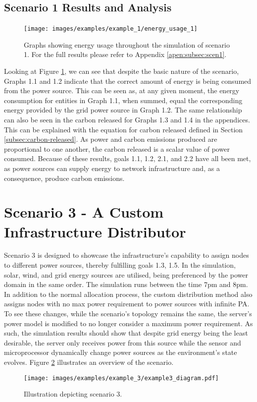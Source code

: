 \documentclass{l4proj}
\begin{document}
\subsection{Scenario 1 Results and Analysis}
\begin{figure}[h]
    \centering
    \texttt{[image: images/examples/example\_1/energy\_usage\_1]}
    ~
    \caption{Graphs showing energy usage throughout the simulation of scenario 1. For the full results please refer to Appendix \ref{apen:subsec:scen1}.}
    \label{fig:example1_results_energy}
\end{figure}
Looking at Figure \ref{fig:example1_results_energy}, we can see that despite the basic nature of the scenario, Graphs 1.1 and 1.2 indicate that the correct amount of energy is being consumed from the power source.
This can be seen as, at any given moment, the energy consumption for entities in Graph 1.1, when summed, equal the corresponding energy provided by the grid power source in Graph 1.2.
The same relationship can also be seen in the carbon released for Graphs 1.3 and 1.4 in the appendices.
This can be explained with the equation for carbon released defined in Section \ref{subsec:carbon-released}.
As power and carbon emissions produced are proportional to one another, the carbon released is a scalar value of power consumed.
Because of these results, goals 1.1, 1.2, 2.1, and 2.2 have all been met, as power sources can supply energy to network infrastructure and, as a consequence, produce carbon emissions.

\section{Scenario 3 - A Custom Infrastructure Distributor}\label{eval:subsec:scenario3}
Scenario 3 is designed to showcase the infrastructure's capability to assign nodes to different power sources, thereby fulfilling goals 1.3, 1.5.
In the simulation, solar, wind, and grid energy sources are utilised, being preferenced by the power domain in the same order.
The simulation runs between the time 7pm and 8pm.
In addition to the normal allocation process, the custom distribution method also assigns nodes with no max power requirement to power sources with infinite PA.
To see these changes, while the scenario's topology remains the same, the server's power model is modified to no longer consider a maximum power requirement.
As such, the simulation results should show that despite grid energy being the least desirable, the server only receives power from this source while the sensor and microprocessor dynamically change power sources as the environment's state evolves.
Figure \ref{fig:example3_diagram} illustrates an overview of the scenario.
\begin{figure}[h]
    \centering
    \texttt{[image: images/examples/example\_3/example3\_diagram.pdf]}
    \caption{Illustration depicting scenario 3.}
    \label{fig:example3_diagram}
\end{figure}
\end{document}

